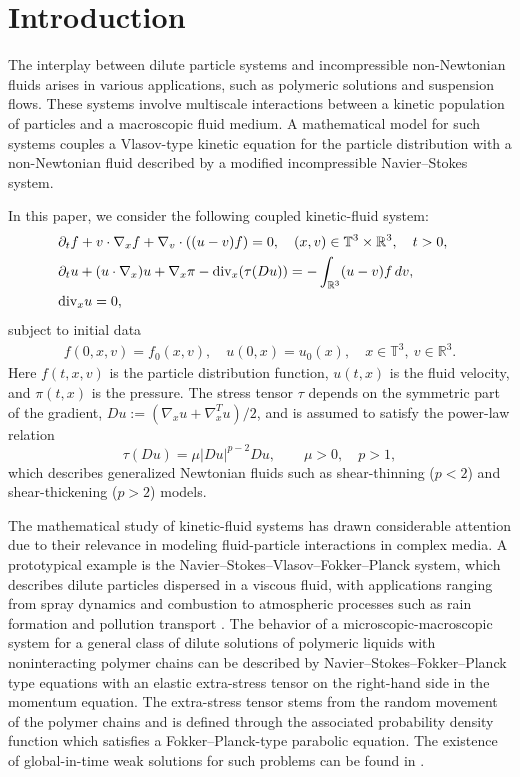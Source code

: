 \documentclass[10pt,reqno]{amsart}
\numberwithin{equation}{section}
\newcommand{\R}{\mathbb R}
\newcommand{\T}{\mathbb T}
\newcommand{\pa}{\partial}
\begin{document}
\section{Introduction}
The interplay between dilute particle systems and incompressible non-Newtonian fluids arises in various applications, such as polymeric solutions and suspension flows. These systems involve multiscale interactions between a kinetic population of particles and a macroscopic fluid medium. A mathematical model for such systems couples a Vlasov-type kinetic equation for the particle distribution with a non-Newtonian fluid described by a modified incompressible Navier--Stokes system.

In this paper, we consider the following coupled kinetic-fluid system:
\begin{align}\label{main_eq}
\begin{aligned}
&\pa_t f + v \cdot \nabla_x f + \nabla_v \cdot ((u-v)f) = 0,  \quad (x,v) \in \T^3 \times \R^3, \quad t > 0,\cr
&\pa_t u + (u \cdot \nabla_x)u + \nabla_x \pi - \mbox{div}_x (\tau(Du)) = -\int_{\R^3} (u-v)f\,dv, \cr
&\mbox{div}_x u = 0,
\end{aligned}
\end{align}
subject to initial data
\begin{align}\label{init_data}
f(0,x,v) = f_0(x,v), \quad u(0,x) = u_0(x), \quad x \in \T^3, \ v \in \R^3.
\end{align}
Here $f(t,x,v)$ is the particle distribution function, $u(t,x)$ is the fluid velocity, and $\pi(t,x)$ is the pressure.  The stress tensor $\tau$ depends on the symmetric part of the gradient, $Du := (\nabla_x u + \nabla_x^T u)/2$, and is assumed to satisfy the power-law relation
\[
\tau(Du) = \mu |Du|^{p-2}Du, \qquad \mu > 0,\quad p > 1,
\]
which describes generalized Newtonian fluids such as shear-thinning ($p<2$) and shear-thickening ($p>2$) models.

The mathematical study of kinetic-fluid systems has drawn considerable attention due to their relevance in modeling fluid-particle interactions in complex media. A prototypical example is the Navier--Stokes--Vlasov--Fokker--Planck system, which describes dilute particles dispersed in a viscous fluid, with applications ranging from spray dynamics and combustion to atmospheric processes such as rain formation and pollution transport \cite{BWC00, CGL08, Mat06, Oro81, RM52, RM52_2}.
 The behavior of a microscopic-macroscopic system for a general class of dilute solutions of polymeric liquids with noninteracting polymer chains can be described by Navier--Stokes--Fokker--Planck type equations with an elastic extra-stress tensor on the right-hand side in the momentum equation. The extra-stress tensor stems from the random movement of the polymer chains and is defined through the associated probability density function which satisfies a Fokker--Planck-type parabolic equation. The existence of global-in-time weak solutions for such problems can be found in \cite{BS2011,BS2012}.
\end{document}
